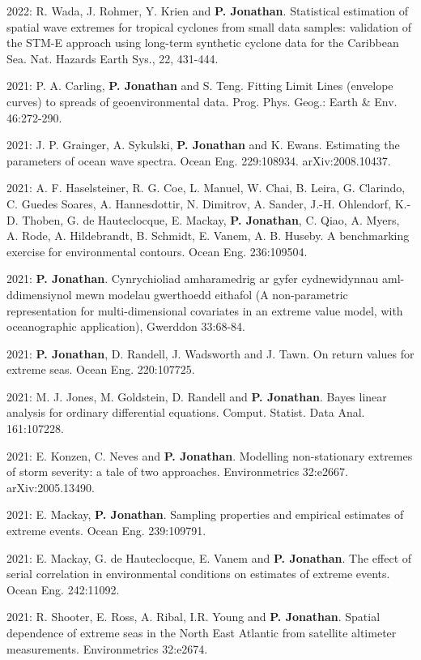 \documentclass[11pt,a4paper]{moderncv}
\begin{document}
2022: R. Wada, J. Rohmer, Y. Krien and \textbf{P. Jonathan}. Statistical estimation of spatial wave extremes for tropical cyclones from small data samples: validation of the STM-E approach using long-term synthetic cyclone data for the Caribbean Sea. Nat. Hazards Earth Sys., 22, 431-444. 

2021: P. A. Carling, \textbf{P. Jonathan} and S. Teng. Fitting Limit Lines (envelope curves) to spreads of geoenvironmental data. Prog. Phys. Geog.: Earth \& Env. 46:272-290.

2021: J. P. Grainger, A. Sykulski, \textbf{P. Jonathan} and K. Ewans. Estimating the parameters of ocean wave spectra. Ocean Eng. 229:108934. arXiv:2008.10437.

2021: A. F. Haselsteiner, R. G. Coe, L. Manuel, W. Chai, B. Leira, G. Clarindo, C. Guedes Soares, A. Hannesdottir, N. Dimitrov, A. Sander, J.-H. Ohlendorf, K.-D. Thoben, G. de Hauteclocque, E. Mackay, \textbf{P. Jonathan}, C. Qiao, A. Myers, A. Rode, A. Hildebrandt, B. Schmidt, E. Vanem, A. B. Huseby. A benchmarking exercise for environmental contours. Ocean Eng. 236:109504.

2021: \textbf{P. Jonathan}. Cynrychioliad amharamedrig ar gyfer cydnewidynnau aml-ddimensiynol mewn modelau gwerthoedd eithafol (A non-parametric representation for multi-dimensional covariates in an extreme value model, with oceanographic application), Gwerddon 33:68-84. 

2021: \textbf{P. Jonathan}, D. Randell, J. Wadsworth and J. Tawn. On return values for extreme seas. Ocean Eng. 220:107725.

2021: M. J. Jones, M. Goldstein, D. Randell and \textbf{P. Jonathan}. Bayes linear analysis for ordinary differential equations. Comput. Statist. Data Anal. 161:107228.

2021: E. Konzen, C. Neves and \textbf{P. Jonathan}. Modelling non-stationary extremes of storm severity: a tale of two approaches. Environmetrics 32:e2667. arXiv:2005.13490.

2021: E. Mackay,  \textbf{P. Jonathan}. Sampling properties and empirical estimates of extreme events. Ocean Eng. 239:109791.

2021: E. Mackay, G. de Hauteclocque, E. Vanem and \textbf{P. Jonathan}. The effect of serial correlation in environmental conditions on estimates of extreme events. Ocean Eng. 242:11092.

2021: R. Shooter, E. Ross, A. Ribal, I.R. Young and \textbf{P. Jonathan}. Spatial dependence of extreme seas in the North East Atlantic from satellite altimeter measurements. Environmetrics 32:e2674.
\end{document}
